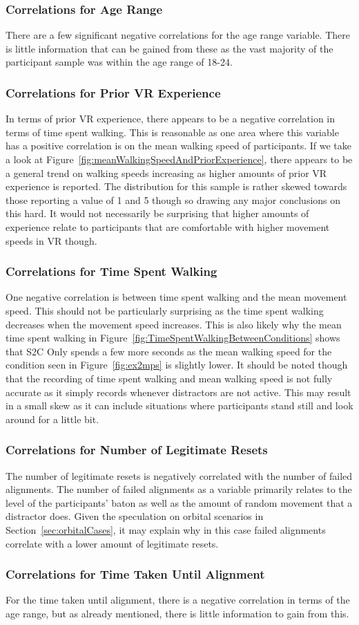 \subsubsection{Correlations for Age Range}
There are a few significant negative correlations for the age range variable. There is little information that can be gained from these as the vast majority of the participant sample was within the age range of 18-24. 

\subsubsection{Correlations for Prior VR Experience}
In terms of prior VR experience, there appears to be a negative correlation in terms of time spent walking. This is reasonable as one area where this variable has a positive correlation is on the mean walking speed of participants. If we take a look at Figure~\ref{fig:meanWalkingSpeedAndPriorExperience}, there appears to be a general trend on walking speeds increasing as higher amounts of prior VR experience is reported. The distribution for this sample is rather skewed towards those reporting a value of 1 and 5 though so drawing any major conclusions on this hard. It would not necessarily be surprising that higher amounts of experience relate to participants that are comfortable with higher movement speeds in VR though.

\subsubsection{Correlations for Time Spent Walking}
One negative correlation is between time spent walking and the mean movement speed. This should not be particularly surprising as the time spent walking decreases when the movement speed increases. This is also likely why the mean time spent walking in Figure~\ref{fig:TimeSpentWalkingBetweenConditions} shows that S2C Only spends a few more seconds as the mean walking speed for the condition seen in Figure~\ref{fig:ex2mps} is slightly lower. It should be noted though that the recording of time spent walking and mean walking speed is not fully accurate as it simply records whenever distractors are not active. This may result in a small skew as it can include situations where participants stand still and look around for a little bit. 

\subsubsection{Correlations for Number of Legitimate Resets}
The number of legitimate resets is negatively correlated with the number of failed alignments. The number of failed alignments as a variable primarily relates to the level of the participants' baton as well as the amount of random movement that a distractor does. Given the speculation on orbital scenarios in Section~\ref{sec:orbitalCases}, it may explain why in this case failed alignments correlate with a lower amount of legitimate resets. 

\subsubsection{Correlations for Time Taken Until Alignment}
For the time taken until alignment, there is a negative correlation in terms of the age range, but as already mentioned, there is little information to gain from this.
